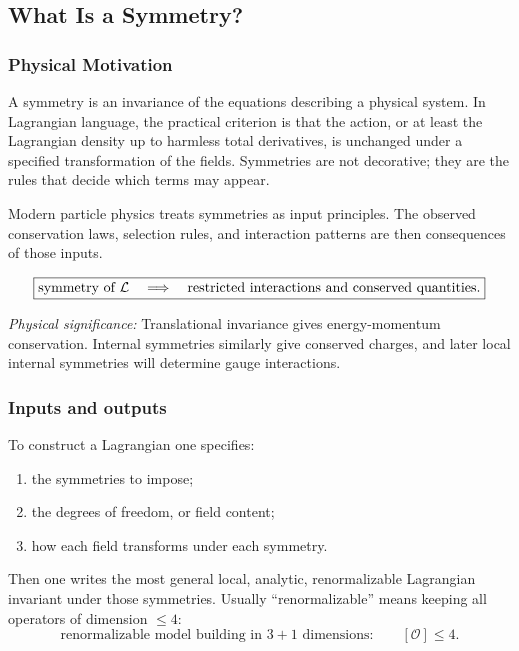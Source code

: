 \documentclass[../main.tex]{subfiles}
\begin{document}
\subsection*{What Is a Symmetry?}

\subsubsection*{Physical Motivation}

A symmetry is an invariance of the equations describing a physical system.  In Lagrangian language, the practical criterion is that the action, or at least the Lagrangian density up to harmless total derivatives, is unchanged under a specified transformation of the fields.  Symmetries are not decorative; they are the rules that decide which terms may appear.

Modern particle physics treats symmetries as input principles.  The observed conservation laws, selection rules, and interaction patterns are then consequences of those inputs.

\begin{equation}
  \boxed{
  \text{symmetry of }\mathcal{L}
  \quad\Longrightarrow\quad
  \text{restricted interactions and conserved quantities.}}
  \label{eq:lec09:symmetry-consequence}
\end{equation}

\textit{Physical significance:} Translational invariance gives energy-momentum conservation.  Internal symmetries similarly give conserved charges, and later local internal symmetries will determine gauge interactions.

\subsubsection*{Inputs and outputs}

To construct a Lagrangian one specifies:
\begin{enumerate}
  \item the symmetries to impose;
  \item the degrees of freedom, or field content;
  \item how each field transforms under each symmetry.
\end{enumerate}

Then one writes the most general local, analytic, renormalizable Lagrangian invariant under those symmetries.  Usually ``renormalizable'' means keeping all operators of dimension $\leq4$:
\begin{equation}
  \boxed{
  \text{renormalizable model building in }3+1\text{ dimensions:}
  \qquad
  [\mathcal{O}]\leq 4.}
  \label{eq:lec09:dimension-four-rule}
\end{equation}
\end{document}
